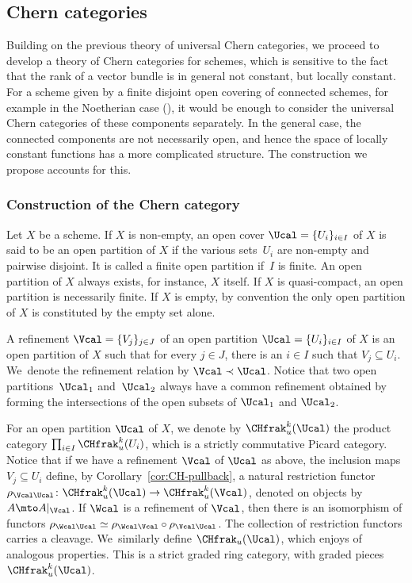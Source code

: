 \subsection{Chern categories}\label{subsec:Chern-category-quasi-compact}
Building on the previous theory of universal Chern categories, we proceed to develop a theory of Chern categories for schemes, which is sensitive to the fact that the rank of a vector bundle is in general not constant, but locally constant. For a scheme given by a finite disjoint open covering of connected schemes, for example in the Noetherian case (\cf \cite[\href{https://stacks.math.columbia.edu/tag/04MF}{04MF}]{stacks-project}), it would be enough to consider the universal Chern categories of these components separately. In the general case, the connected components are not necessarily open, and hence the space of locally constant functions has a more complicated structure. The construction we propose accounts for this.

\subsubsection{Construction of the Chern category}
Let $X$ be a scheme. If $X$ is non-empty, an open cover $\Ucal=\lbrace U_{i}\rbrace_{i\in I}$ of $X$ is said to be an open partition of $X$ if the various sets~$U_i$ are non-empty and pairwise disjoint. It is called a finite open partition if~$I$ is finite. An open partition of $X$ always exists, for instance, $X$ itself. If $X$ is quasi-compact, an open partition is necessarily finite. If $X$ is empty, by convention the only open partition of $X$ is constituted by the empty set alone.

A refinement $\Vcal=\lbrace V_{j}\rbrace_{j\in J}$ of an open partition $\Ucal=\lbrace U_{i}\rbrace_{i\in I}$ of $X$ is an open partition of $X$ such that for every $j \in J$, there is an $i \in I$ such that $V_j \subseteq U_i$. We~denote the refinement relation by $\Vcal\prec\Ucal$. Notice that two open partitions~$\Ucal_{1}$ and~$\Ucal_{2}$ always have a common refinement obtained by forming the intersections of the open subsets of $\Ucal_{1}$ and $\Ucal_{2}$.

For an open partition $\Ucal$ of $X$, we denote by $\CHfrak_{u}^{k}(\Ucal)$ the product category $\prod_{i\in I}\CHfrak_u^{k}(U_{i})$, which is a strictly commutative Picard category. Notice that if we have a refinement $\Vcal$ of $\Ucal$ as above, the inclusion maps $V_j \subseteq U_i$ define, by Corollary~\ref{cor:CH-pullback}, a natural restriction functor $\rho_{\Vcal\Ucal}\colon \CHfrak_{u}^{k}(\Ucal) \to \CHfrak_{u}^{k}(\Vcal)$, denoted on objects by $A\mto A|_{\Vcal}$. If $\Wcal$ is a refinement of $\Vcal$, then there is an isomorphism of functors $\rho_{\Wcal\Ucal}\simeq\rho_{\Wcal\Vcal}\circ\rho_{\Vcal\Ucal}$. The collection of restriction functors carries a cleavage. We~similarly define $\CHfrak_{u}(\Ucal)$, which enjoys of analogous properties. This is a strict graded ring category, with graded pieces $\CHfrak^{k}_{u}(\Ucal)$.

